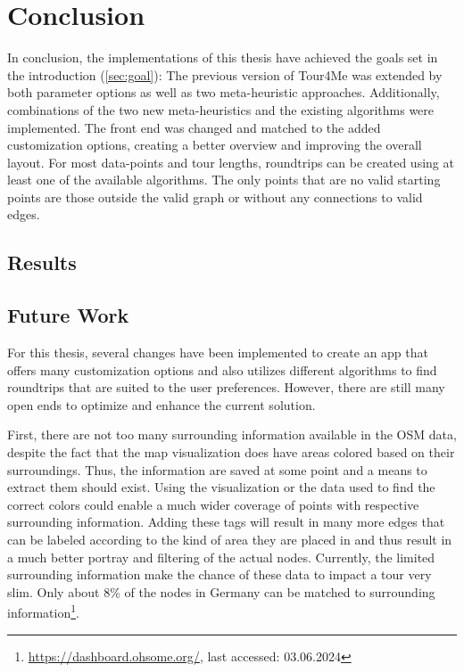 \chapter{Conclusion}
\label{chapter:conclusion}

In conclusion, the implementations of this thesis have achieved the goals set in the introduction (\ref{sec:goal}):
The previous version of Tour4Me was extended by both parameter options as well as two meta-heuristic approaches. 
Additionally, combinations of the two new meta-heuristics and the existing algorithms were implemented.
The front end was changed and matched to the added customization options, creating a better overview and improving the overall layout.
For most data-points and tour lengths, roundtrips can be created using at least one of the available algorithms. 
The only points that are no valid starting points are those outside the valid graph or without any connections to valid edges.

\section{Results}
\label{sec:results}




\section{Future Work}
\label{sec:futureWork}

For this thesis, several changes have been implemented to create an app that offers many customization options and also utilizes different algorithms to find roundtrips that are suited to the user preferences.
However, there are still many open ends to optimize and enhance the current solution.

First, there are not too many surrounding information available in the OSM data, despite the fact that the map visualization does have areas colored based on their surroundings.
Thus, the information are saved at some point and a means to extract them should exist.
Using the visualization or the data used to find the correct colors could enable a much wider coverage of points with respective surrounding information. 
Adding these tags will result in many more edges that can be labeled according to the kind of area they are placed in and thus result in a much better portray and filtering of the actual nodes.
Currently, the limited surrounding information make the chance of these data to impact a tour very slim.
Only about 8\% of the nodes in Germany can be matched to surrounding information\footnote{\url{https://dashboard.ohsome.org/}, last accessed: 03.06.2024}.

